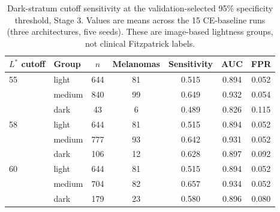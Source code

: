 \begin{table}[t]
\centering
\small
\caption{Dark-stratum cutoff sensitivity at the validation-selected 95\% specificity threshold, Stage 3. Values are means across the 15 CE-baseline runs (three architectures, five seeds). These are image-based lightness groups, not clinical Fitzpatrick labels.}
\label{tab:darkskin}
\begin{tabular}{llccccc}
\toprule
$L^*$ cutoff & Group & $n$ & Melanomas & Sensitivity & AUC & FPR \\
\midrule
55 & light & 644 & 81 & 0.515 & 0.894 & 0.052 \\
 & medium & 840 & 99 & 0.649 & 0.932 & 0.054 \\
 & dark & 43 & 6 & 0.489 & 0.826 & 0.115 \\
\midrule
58 & light & 644 & 81 & 0.515 & 0.894 & 0.052 \\
 & medium & 777 & 93 & 0.642 & 0.931 & 0.052 \\
 & dark & 106 & 12 & 0.628 & 0.897 & 0.092 \\
\midrule
60 & light & 644 & 81 & 0.515 & 0.894 & 0.052 \\
 & medium & 704 & 82 & 0.657 & 0.934 & 0.052 \\
 & dark & 179 & 23 & 0.580 & 0.896 & 0.080 \\
\bottomrule
\end{tabular}
\end{table}
